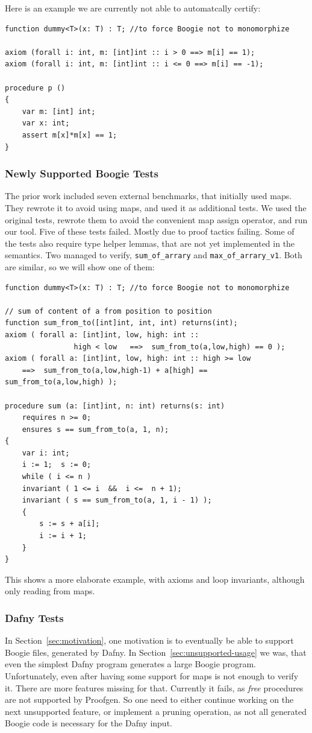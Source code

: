 \documentclass[11pt]{article}
\begin{document}
Here is an example we are currently not able to automatcally certify:

\begin{verbatim}
function dummy<T>(x: T) : T; //to force Boogie not to monomorphize

axiom (forall i: int, m: [int]int :: i > 0 ==> m[i] == 1);
axiom (forall i: int, m: [int]int :: i <= 0 ==> m[i] == -1);

procedure p ()
{
    var m: [int] int;
    var x: int;
    assert m[x]*m[x] == 1;
}
\end{verbatim}

\subsubsection{Newly Supported Boogie Tests}

The prior work \cite{parthasarathy2021formally} included seven external benchmarks, that initially used maps.
They rewrote it to avoid using maps, and used it as additional tests.
We used the original tests, rewrote them to avoid the convenient map assign operator,
and run our tool.
Five of these tests failed. Mostly due to proof tactics failing.
Some of the tests also require type helper lemmas, that are not yet implemented in the semantics.
Two managed to verify, \texttt{sum\_of\_arrary} and \texttt{max\_of\_arrary\_v1}.
Both are similar, so we will show one of them:

\begin{verbatim}
function dummy<T>(x: T) : T; //to force Boogie not to monomorphize

// sum of content of a from position to position
function sum_from_to([int]int, int, int) returns(int);
axiom ( forall a: [int]int, low, high: int ::
				high < low   ==>  sum_from_to(a,low,high) == 0 );
axiom ( forall a: [int]int, low, high: int :: high >= low
    ==>  sum_from_to(a,low,high-1) + a[high] == sum_from_to(a,low,high) );

procedure sum (a: [int]int, n: int) returns(s: int)
	requires n >= 0;
	ensures s == sum_from_to(a, 1, n);
{
	var i: int;
	i := 1;  s := 0;
	while ( i <= n )
	invariant ( 1 <= i  &&  i <=  n + 1);
	invariant ( s == sum_from_to(a, 1, i - 1) );
	{
		s := s + a[i];
		i := i + 1;
	}
}
\end{verbatim}

This shows a more elaborate example,
with axioms and loop invariants, although only reading from maps.


\subsubsection{Dafny Tests}
In Section~\ref{sec:motivation}, one motivation is to eventually be able to support Boogie files, generated by Dafny.
In Section~\ref{sec:unsupported-usage} we was, that even the simplest Dafny program
generates a large Boogie program.
Unfortunately, even after having some support for maps is not enough to verify it.
There are more features missing for that.
Currently it fails, as \emph{free} procedures are not supported by Proofgen.
So one need to either continue working on the next unsupported feature,
or implement a pruning operation, as not all generated Boogie code is necessary for the Dafny input.
\end{document}
